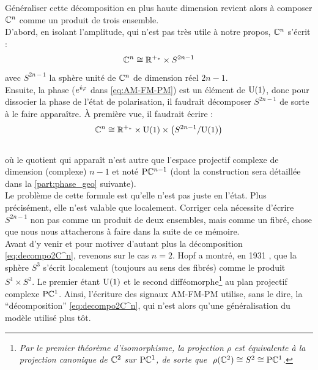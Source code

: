 Généraliser cette décomposition en plus haute dimension revient alors à composer $\mathbb{C}^n$ comme un produit de trois ensemble. 
\\
D'abord, en isolant l'amplitude, qui n'est pas très utile à notre propos, $\mathbb{C}^n$ s'écrit :
\[\mathbb{C}^n \cong \mathbb{R}^{+_*} \times S^{2n-1}\]
avec $S^{2n-1}$ la sphère unité de $\mathbb{C}^n$ de dimension réel $2n-1$.
\\
Ensuite, la phase ($e^{\boldsymbol{i} \varphi}$ dans \eqref{eq:AM-FM-PM}) est un élément de $\text{\normalfont U}(1)$, donc pour dissocier la phase de l'état de polarisation, il faudrait décomposer $S^{2n-1}$ de sorte à le faire apparaître. À première vue, il faudrait écrire :
\begin{equation}\label{eq:decompo2C^n}
	\mathbb{C}^n \cong \mathbb{R}^{+_*} \times \text{\normalfont U}(1) \times \big( S^{2n-1}/\text{\normalfont U}(1) \big)
\end{equation}
\\
où le quotient qui apparaît n'est autre que l'espace projectif complexe de dimension (complexe) $n-1$ et noté $\text{\normalfont P}\mathbb{C}^{n-1}$ (dont la construction sera détaillée dans la \cref{part:phase_geo} suivante).
\\
Le problème de cette formule est qu'elle n'est pas juste en l'état. Plus précisément, elle n'est valable que localement. 
Corriger cela nécessite d'écrire $S^{2n-1}$ non pas comme un produit de deux ensembles, mais comme un fibré, chose que nous nous attacherons à faire dans la suite de ce mémoire.
\\

Avant d'y venir et pour motiver d'autant plus la décomposition \eqref{eq:decompo2C^n}, revenons sur le cas $n=2$. Hopf a montré, en 1931 \cite{hopf_uber_1931}, que la sphère $S^3$ s'écrit localement (toujours au sens des fibrés) comme le produit $S^1\times S^2$. Le premier étant $\text{\normalfont U}(1)$ et le second difféomorphe\footnote{\itshape
Par le premier théorème d'isomorphisme, la projection $\rho$ est équivalente à la projection canonique de $\mathbb{C}^2$ sur $\text{\normalfont P}\mathbb{C}^{1}$, de sorte que $\ \rho(\mathbb{C}^2)\cong S^2\cong \text{\normalfont P}\mathbb{C}^{1}$.}
au plan projectif complexe $\text{\normalfont P}\mathbb{C}^{1}$.
Ainsi, l'écriture des signaux AM-FM-PM utilise, sans le dire, la ``décomposition'' \eqref{eq:decompo2C^n}, qui n'est alors qu'une généralisation du modèle utilisé plus tôt.
